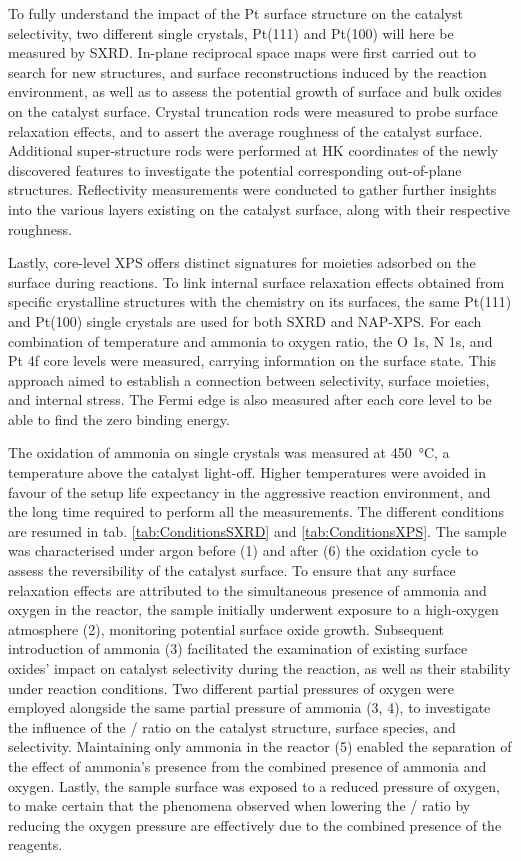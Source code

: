 To fully understand the impact of the Pt surface structure on the catalyst selectivity, two different single crystals, Pt(111) and Pt(100) will here be measured by SXRD.
In-plane reciprocal space maps were first carried out to search for new structures, and surface reconstructions induced by the reaction environment, as well as to assess the potential growth of surface and bulk oxides on the catalyst surface.
Crystal truncation rods were measured to probe surface relaxation effects, and to assert the average roughness of the catalyst surface.
Additional super-structure rods were performed at HK coordinates of the newly discovered features to investigate the potential corresponding out-of-plane structures.
Reflectivity measurements were conducted to gather further insights into the various layers existing on the catalyst surface, along with their respective roughness.

Lastly, core-level XPS offers distinct signatures for moieties adsorbed on the surface during reactions.
To link internal surface relaxation effects obtained from specific crystalline structures with the chemistry on its surfaces, the same Pt(111) and Pt(100) single crystals are used for both SXRD and NAP-XPS.
For each combination of temperature and ammonia to oxygen ratio, the O 1s, N 1s, and Pt 4f core levels were measured, carrying information on the surface state.
This approach aimed to establish a connection between selectivity, surface moieties, and internal stress.
The Fermi edge is also measured after each core level to be able to find the zero binding energy.

The oxidation of ammonia on single crystals was measured at \qty{450}{\degreeCelsius}, a temperature above the catalyst light-off.
Higher temperatures were avoided in favour of the setup life expectancy in the aggressive reaction environment, and the long time required to perform all the measurements.
The different conditions are resumed in tab. \ref{tab:ConditionsSXRD} and \ref{tab:ConditionsXPS}.
The sample was characterised under argon before (1) and after (6) the oxidation cycle to assess the reversibility of the catalyst surface.
To ensure that any surface relaxation effects are attributed to the simultaneous presence of ammonia and oxygen in the reactor, the sample initially underwent exposure to a high-oxygen atmosphere (2), monitoring potential surface oxide growth.
Subsequent introduction of ammonia (3) facilitated the examination of existing surface oxides' impact on catalyst selectivity during the reaction, as well as their stability under reaction conditions.
Two different partial pressures of oxygen were employed alongside the same partial pressure of ammonia (3, 4), to investigate the influence of the / ratio on the catalyst structure, surface species, and selectivity.
Maintaining only ammonia in the reactor (5) enabled the separation of the effect of ammonia's presence from the combined presence of ammonia and oxygen.
Lastly, the sample surface was exposed to a reduced pressure of oxygen, to make certain that the phenomena observed when lowering the / ratio by reducing the oxygen pressure are effectively due to the combined presence of the reagents.

